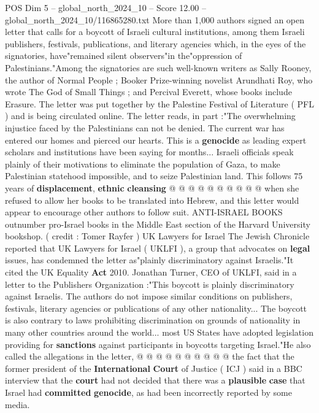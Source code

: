 \begin{textsample}{POS Dim 5 – global\_north\_2024\_10 – Score 12.00 – global\_north\_2024\_10/116865280.txt}  \label{ex:f5_pos_405}
More than 1,000 authors signed an open letter that calls for a boycott of Israeli cultural institutions, among them Israeli publishers, festivals, publications, and literary agencies which, in the eyes of the signatories, have"remained silent observers"in the"oppression of Palestinians."Among the signatories are such well-known writers as Sally Rooney, the author of Normal People ; Booker Prize-winning novelist Arundhati Roy, who wrote The God of Small Things ; and Percival Everett, whose books include Erasure.
The letter was put together by the Palestine Festival of Literature ( PFL ) and is being circulated online.
The letter reads, in part :"The overwhelming injustice faced by the Palestinians can not be denied.
The current war has entered our homes and pierced our hearts.
This is a \textbf{genocide} as leading expert scholars and institutions have been saying for months...
Israeli officials speak plainly of their motivations to eliminate the population of Gaza, to make Palestinian statehood impossible, and to seize Palestinian land.
This follows 75 years of \textbf{displacement}, \textbf{ethnic} \textbf{cleansing} @ @ @ @ @ @ @ @ @ @ when she refused to allow her books to be translated into Hebrew, and this letter would appear to encourage other authors to follow suit.
ANTI-ISRAEL BOOKS outnumber pro-Israel books in the Middle East section of the Harvard University bookshop. ( credit : Tomer Rayfer ) UK Lawyers for Israel The Jewish Chronicle reported that UK Lawyers for Israel ( UKLFI ), a group that advocates on \textbf{legal} issues, has condemned the letter as"plainly discriminatory against Israelis."It cited the UK Equality \textbf{Act} 2010.
Jonathan Turner, CEO of UKLFI, said in a letter to the Publishers Organization :"This boycott is plainly discriminatory against Israelis.
The authors do not impose similar conditions on publishers, festivals, literary agencies or publications of any other nationality...
The boycott is also contrary to laws prohibiting discrimination on grounds of nationality in many other countries around the world... most US States have adopted legislation providing for \textbf{sanctions} against participants in boycotts targeting Israel."He also called the allegations in the letter, @ @ @ @ @ @ @ @ @ @ the fact that the former president of the \textbf{International} \textbf{Court} of Justice ( ICJ ) said in a BBC interview that the \textbf{court} had not decided that there was a \textbf{plausible} \textbf{case} that Israel had \textbf{committed} \textbf{genocide}, as had been incorrectly reported by some media.

\end{textsample}

